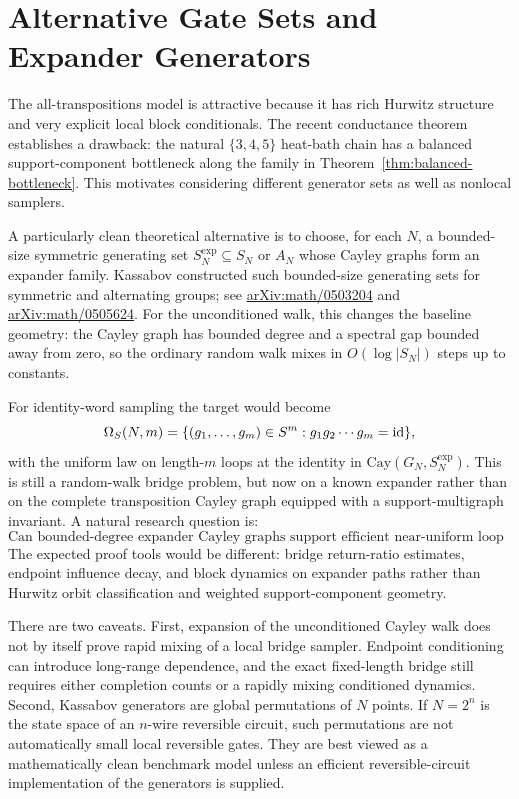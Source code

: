 \section{Alternative Gate Sets and Expander Generators}

The all-transpositions model is attractive because it has rich Hurwitz
structure and very explicit local block conditionals.  The recent
conductance theorem establishes a drawback: the natural $\{3,4,5\}$
heat-bath chain has a balanced support-component bottleneck along the
family in Theorem~\ref{thm:balanced-bottleneck}.  This motivates considering
different generator sets as well as nonlocal samplers.

A particularly clean theoretical alternative is to choose, for each $N$, a
bounded-size symmetric generating set $S_N^{\mathrm{exp}}\subseteq S_N$ or
$A_N$ whose Cayley graphs form an expander family.  Kassabov constructed such
bounded-size generating sets for symmetric and alternating groups; see
\href{https://arxiv.org/abs/math/0503204}{arXiv:math/0503204} and
\href{https://arxiv.org/abs/math/0505624}{arXiv:math/0505624}.  For the
unconditioned walk, this changes the baseline geometry: the Cayley graph has
bounded degree and a spectral gap bounded away from zero, so the ordinary
random walk mixes in $O(\log |S_N|)$ steps up to constants.

For identity-word sampling the target would become
\[
  \Omega_S(N,m)
  =
  \{(g_1,\ldots,g_m)\in S^m :
      g_1g_2\cdots g_m=\mathrm{id}\},
\]
with the uniform law on length-$m$ loops at the identity in
$\mathrm{Cay}(G_N,S_N^{\mathrm{exp}})$.  This is still a random-walk bridge
problem, but now on a known expander rather than on the complete
transposition Cayley graph equipped with a support-multigraph invariant.  A
natural research question is:
\[
  \text{Can bounded-degree expander Cayley graphs support efficient
  near-uniform loop samplers?}
\]
The expected proof tools would be different: bridge return-ratio estimates,
endpoint influence decay, and block dynamics on expander paths rather than
Hurwitz orbit classification and weighted support-component geometry.

There are two caveats.  First, expansion of the unconditioned Cayley walk does
not by itself prove rapid mixing of a local bridge sampler.  Endpoint
conditioning can introduce long-range dependence, and the exact fixed-length
bridge still requires either completion counts or a rapidly mixing
conditioned dynamics.  Second, Kassabov generators are global permutations of
$N$ points.  If $N=2^n$ is the state space of an $n$-wire reversible circuit,
such permutations are not automatically small local reversible gates.  They
are best viewed as a mathematically clean benchmark model unless an efficient
reversible-circuit implementation of the generators is supplied.

